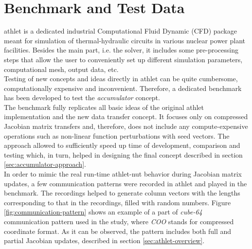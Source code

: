 \section{Benchmark and Test Data}
\label{sec:benchmark-and-test-data}


\acrshort{athlet} is a dedicated industrial Computational Fluid Dynamic (CFD) package meant for simulation of thermal-hydraulic circuits in various nuclear power plant facilities. Besides the main part, i.e. the solver, it includes some pre-processing steps that allow the user to conveniently set up different simulation parameters, computational mesh, output data, etc.\\


Testing of new concepts and ideas directly in \acrshort{athlet} can be quite cumbersome, computationally expensive and inconvenient. Therefore, a dedicated benchmark has been developed to test the \textit{accumulator} concept.\\


The benchmark fully replicates all basic ideas of the original \acrshort{athlet} implementation and the new data transfer concept. It  focuses only on compressed Jacobian matrix transfers and, therefore, does not include any compute-expensive operations such as non-linear function perturbations with seed vectors. The approach allowed to sufficiently speed up time of development, comparison and testing which, in turn, helped in designing the final concept described in section \ref{sec:accumulator-approach}.\\%


In order to mimic the real run-time \acrshort{athlet}-\acrshort{nut} behavior during Jacobian matrix updates, a few communication patterns were recorded in \acrshort{athlet} and played in the benchmark. The recordings helped to generate column vectors with the lengths corresponding to that in the recordings, filled with random numbers. Figure \ref{fig:communication-pattern} shows an example of a part of  \textit{cube-64} communication pattern used in the study, where \textit{COO} stands for compressed coordinate format. As it can be observed, the pattern includes both full and partial Jacobian updates, described in section \ref{sec:athlet-overview}.\\


